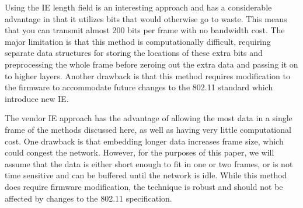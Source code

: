 \documentclass[letterpaper, 10 pt, conference]{ieeeconf}  %
\begin{document}
Using the IE length field is an interesting approach and has a considerable advantage in that it utilizes bits that would otherwise go to waste. This means that you can transmit almost 200 bits per frame with no bandwidth cost.  The major limitation is that this method is computationally difficult, requiring separate data structures for storing the locations of these extra bits and preprocessing the whole frame before zeroing out the extra data and passing it on to higher layers. Another drawback is that this method requires modification to the firmware to accommodate future changes to the 802.11 standard which introduce new IE.

The vendor IE approach has the advantage of allowing the most data in a single frame of the methods discussed here, as well as having very little computational cost.  One drawback is that embedding longer data increases frame size, which could congest the network.  However, for the purposes of this paper, we will assume that the data is either short enough to fit in one or two frames, or is not time sensitive and can be buffered until the network is idle. While this method does require firmware modification, the technique is robust and should not be affected by changes to the 802.11 specification.







\end{document}
